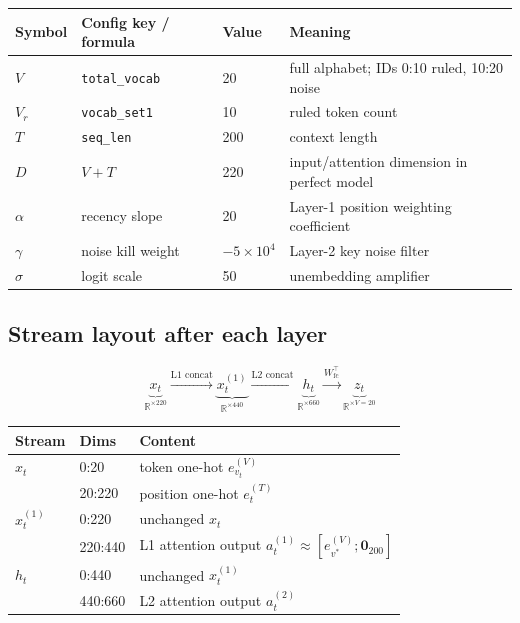 \documentclass[11pt]{article}
\newcommand{\R}{\mathbb{R}}
\begin{document}
\begin{center}
\begin{tabular}{llll}
\toprule
\textbf{Symbol} & \textbf{Config key / formula} & \textbf{Value} & \textbf{Meaning}\\
\midrule
$V$      & \texttt{total\_vocab} & 20             & full alphabet; IDs 0:10 ruled, 10:20 noise\\
$V_r$    & \texttt{vocab\_set1}  & 10             & ruled token count\\
$T$      & \texttt{seq\_len}     & 200            & context length\\
$D$      & $V+T$                 & 220            & input/attention dimension in perfect model\\
$\alpha$ & recency slope         & 20             & Layer-1 position weighting coefficient\\
$\gamma$ & noise kill weight     & $-5\times10^4$ & Layer-2 key noise filter\\
$\sigma$ & logit scale           & 50             & unembedding amplifier\\
\bottomrule
\end{tabular}
\end{center}

\subsection*{Stream layout after each layer}

\[
\underbrace{x_t}_{\R^{\times 220}}
\xrightarrow{\text{L1 concat}}
\underbrace{x_t^{(1)}}_{\R^{\times 440}}
\xrightarrow{\text{L2 concat}}
\underbrace{h_t}_{\R^{\times 660}}
\xrightarrow{W_{\mathrm{fc}}^\top}
\underbrace{z_t}_{\R^{\times V=20}}
\]

\begin{center}
\begin{tabular}{lll}
\toprule
\textbf{Stream} & \textbf{Dims} & \textbf{Content}\\
\midrule
$x_t$ & 0:20   & token one-hot $e_{v_t}^{(V)}$\\
      & 20:220 & position one-hot $e_t^{(T)}$\\
\midrule
$x_t^{(1)}$ & 0:220   & unchanged $x_t$\\
            & 220:440 & L1 attention output $a_t^{(1)}\approx[e_{v^*}^{(V)};\mathbf{0}_{200}]$\\
\midrule
$h_t$ & 0:440   & unchanged $x_t^{(1)}$\\
      & 440:660 & L2 attention output $a_t^{(2)}$\\
\bottomrule
\end{tabular}
\end{center}
\end{document}

